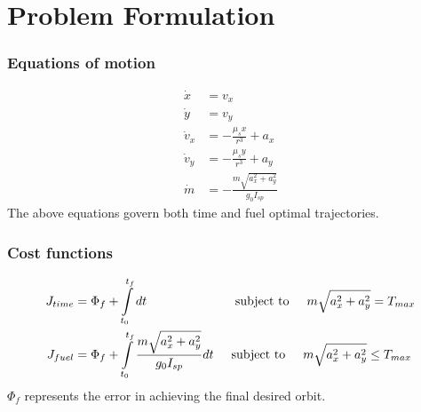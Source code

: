 \documentclass{beamer}
\begin{document}
\section{Problem Formulation}
\begin{frame}
	\frametitle{Equations of motion}
	\begin{align}
		\dot{x}&=v_x\\
		\dot{y}&=v_y\\
		\dot{v}_x&=-\frac{\mu_s x}{r^3}+a_x\\
		\dot{v}_y&=-\frac{\mu_s y}{r^3}+a_y\\
		\dot{m}&=-\frac{m\sqrt{a_x^2+a_y^2}}{g_0I_{sp}}
	\end{align}
	The above equations govern both time and fuel optimal trajectories.
\end{frame}

\begin{frame}
\frametitle{Cost functions}
\begin{align}
J_{time}&=\Phi_f+\int\limits_{t_0}^{t_f}dt \hspace{25mm}\text{subject to}\hspace{5mm} m\sqrt{a_x^2+a_y^2}=T_{max}\\
J_{fuel}&=\Phi_f+\int\limits_{t_0}^{t_f}\frac{m\sqrt{a_x^2+a_y^2}}{g_0I_{sp}}dt \hspace{5mm}\text{subject to}\hspace{5mm} m\sqrt{a_x^2+a_y^2}\leq T_{max}
\end{align}
$\Phi_f$ represents the error in achieving the final desired orbit.
\end{frame}
\end{document}
